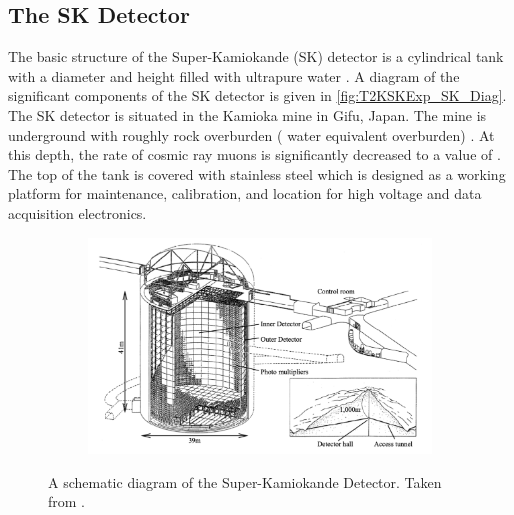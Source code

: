 \subsection{The SK Detector}
\label{subsec:T2KSKExp_SKDetector}

The basic structure of the Super-Kamiokande (SK) detector is a cylindrical tank with a diameter  and height  filled with ultrapure water \cite{Abe_2014_SKCalib}. A diagram of the significant components of the SK detector is given in \autoref{fig:T2KSKExp_SK_Diag}. The SK detector is situated in the Kamioka mine in Gifu, Japan. The mine is underground with roughly  rock overburden ( water equivalent overburden) \cite{Fukuda2003-ly}. At this depth, the rate of cosmic ray muons is significantly decreased to a value of . The top of the tank is covered with stainless steel which is designed as a working platform for maintenance, calibration, and location for high voltage and data acquisition electronics.

\begin{figure}[h]
  \begin{subfigure}[t]{0.95\textwidth}
    \includegraphics[width=\textwidth, trim={0mm 0mm 0mm 0mm}, clip,page=1]{Figures/Detectors/SKDiagram.pdf}
  \end{subfigure}
  \caption{A schematic diagram of the Super-Kamiokande Detector. Taken from \cite{Itow2001-bc}.}
  \label{fig:T2KSKExp_SK_Diag}
\end{figure}

